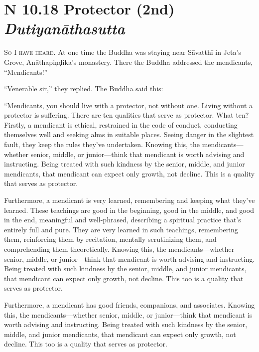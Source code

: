 \documentclass[12pt,openany]{book}%
\newcommand*{\suttatitleacronym}[1]{\smaller[2]{#1}\vspace*{.3em}}
\newcommand*{\suttatitletranslation}[1]{\linebreak{#1}}
\newcommand*{\suttatitleroot}[1]{\linebreak\smaller[2]\itshape{#1}}
\newcommand*{\tocacronym}[1]{\hspace*{-3.3em}{#1}\quad}
\newcommand*{\toctranslation}[1]{#1}
\newcommand*{\tocroot}[1]{(\textit{#1})}
\newcommand*{\scevam}[1]{\textsc{#1}}
\begin{document}
%
\section*{{\suttatitleacronym AN 10.18}{\suttatitletranslation A Protector (2nd) }{\suttatitleroot Dutiyanāthasutta}}
\addcontentsline{toc}{section}{\tocacronym{AN 10.18} \toctranslation{A Protector (2nd) } \tocroot{Dutiyanāthasutta}}

\scevam{So I have heard. }At one time the Buddha was staying near \textsanskrit{Sāvatthī} in Jeta’s Grove, \textsanskrit{Anāthapiṇḍika}’s monastery. There the Buddha addressed the mendicants, “Mendicants!” 

“Venerable sir,” they replied. The Buddha said this: 

“Mendicants, you should live with a protector, not without one. Living without a protector is suffering. There are ten qualities that serve as protector. What ten? Firstly, a mendicant is ethical, restrained in the code of conduct, conducting themselves well and seeking alms in suitable places. Seeing danger in the slightest fault, they keep the rules they’ve undertaken. Knowing this, the mendicants—whether senior, middle, or junior—think that mendicant is worth advising and instructing. Being treated with such kindness by the senior, middle, and junior mendicants, that mendicant can expect only growth, not decline. This is a quality that serves as protector. 

Furthermore, a mendicant is very learned, remembering and keeping what they’ve learned. These teachings are good in the beginning, good in the middle, and good in the end, meaningful and well-phrased, describing a spiritual practice that’s entirely full and pure. They are very learned in such teachings, remembering them, reinforcing them by recitation, mentally scrutinizing them, and comprehending them theoretically. Knowing this, the mendicants—whether senior, middle, or junior—think that mendicant is worth advising and instructing. Being treated with such kindness by the senior, middle, and junior mendicants, that mendicant can expect only growth, not decline. This too is a quality that serves as protector. 

Furthermore, a mendicant has good friends, companions, and associates. Knowing this, the mendicants—whether senior, middle, or junior—think that mendicant is worth advising and instructing. Being treated with such kindness by the senior, middle, and junior mendicants, that mendicant can expect only growth, not decline. This too is a quality that serves as protector. 
\end{document}
